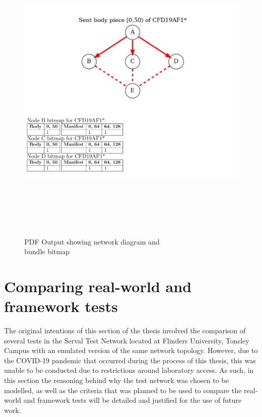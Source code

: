 \begin{figure}[h]
    \begin{centering}
        \includegraphics[width=15cm,height=15cm,keepaspectratio]{Figures/Chapter6-PDFPartition.png}
        \caption{PDF Output showing network diagram and \\bundle bitmap}
        \label{fig:chapter6PDFPartition}
    \end{centering}
\end{figure}

\section{Comparing real-world and framework tests}
The original intentions of this section of the thesis involved the comparison of several tests in the Serval Test Network located at Flinders University, Tonsley Campus with an emulated version of the same network topology.
However, due to the COVID-19 pandemic that occurred during the process of this thesis, this was unable to be conducted due to restrictions around laboratory access.
As such, in this section the reasoning behind why the test network was chosen to be modelled, as well as the criteria that was planned to be used to compare the real-world and framework tests will be detailed and justified for the use of future work.


